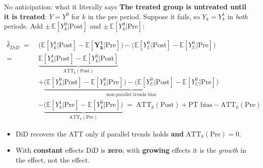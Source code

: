 \documentclass[
  11pt,
  ignorenonframetext,
  aspectratio=169,
]{beamer}
\providecommand{\tightlist}{%
  \setlength{\itemsep}{0pt}\setlength{\parskip}{0pt}}
\begin{document}
\begin{frame}{No anticipation: what it literally says}
\protect{}\label{no-anticipation-what-it-literally-says}
\textbf{The treated group is untreated until it is treated}: \(Y = Y^0\)
for \(k\) in the pre period. Suppose it fails, so \(Y_k = Y^1_k\) in
\emph{both} periods. Add \(\pm\,\mathbb{E}[Y^0_k|\text{Post}]\) and
\(\pm\,\mathbb{E}[Y^0_k|\text{Pre}]\):

\vspace{-0.5em}\small

\begin{align*}
\hat\delta_{DiD} \;=\;& \big(\mathbb{E}[Y^{1}_k|\text{Post}] - \mathbb{E}[\mathbf{Y^{1}_k}|\text{Pre}]\big) - \big(\mathbb{E}[Y^{0}_U|\text{Post}] - \mathbb{E}[Y^{0}_U|\text{Pre}]\big) \\
=\;& \underbrace{\mathbb{E}[Y^1_k|\text{Post}] - \mathbb{E}[Y^0_k|\text{Post}]}_{\text{ATT}_k(\text{Post})} \\
&+ \underbrace{\big(\mathbb{E}[Y^0_k|\text{Post}] - \mathbb{E}[Y^0_k|\text{Pre}]\big) - \big(\mathbb{E}[Y^0_U|\text{Post}] - \mathbb{E}[Y^0_U|\text{Pre}]\big)}_{\text{non-parallel trends bias}} \\
&- \underbrace{\big(\mathbb{E}[Y^1_k|\text{Pre}] - \mathbb{E}[Y^0_k|\text{Pre}]\big)}_{\text{ATT}_k(\text{Pre})}
\;=\; \text{ATT}_k(\text{Post}) + \text{PT bias} - \text{ATT}_k(\text{Pre})
\end{align*} \normalsize\vspace{-0.6em}

\begin{itemize}
\tightlist
\item
  DiD recovers the ATT only if parallel trends holds \textbf{and}
  \(\text{ATT}_k(\text{Pre}) = 0\).
\item
  With \textbf{constant} effects DiD is \textbf{zero}; with
  \textbf{growing} effects it is the \emph{growth} in the effect, not
  the effect.
\end{itemize}
\end{frame}
\end{document}
